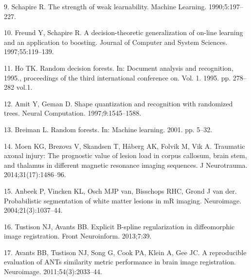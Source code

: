\documentclass[12pt,]{article}
\begin{document}
\hypertarget{ref-schapire1990}{}
9. Schapire R. The strength of weak learnability. Machine Learning.
1990;5:197--227.

\hypertarget{ref-freund1997}{}
10. Freund Y, Schapire R. A decision-theoretic generalization of on-line
learning and an application to boosting. Journal of Computer and System
Sciences. 1997;55:119--139.

\hypertarget{ref-ho1995}{}
11. Ho TK. Random decision forests. In: Document analysis and
recognition, 1995., proceedings of the third international conference
on. Vol. 1. 1995. pp. 278--282 vol.1.

\hypertarget{ref-amit1997}{}
12. Amit Y, Geman D. Shape quantization and recognition with randomized
trees. Neural Computation. 1997;9:1545--1588.

\hypertarget{ref-breiman2001}{}
13. Breiman L. Random forests. In: Machine learning. 2001. pp. 5--32.

\hypertarget{ref-Moen:2014aa}{}
14. Moen KG, Brezova V, Skandsen T, Håberg AK, Folvik M, Vik A.
Traumatic axonal injury: The prognostic value of lesion load in corpus
callosum, brain stem, and thalamus in different magnetic resonance
imaging sequences. J Neurotrauma. 2014;31(17):1486--96.

\hypertarget{ref-Anbeek:2004aa}{}
15. Anbeek P, Vincken KL, Osch MJP van, Bisschops RHC, Grond J van der.
Probabilistic segmentation of white matter lesions in mR imaging.
Neuroimage. 2004;21(3):1037--44.

\hypertarget{ref-Tustison:2013ac}{}
16. Tustison NJ, Avants BB. Explicit B-spline regularization in
diffeomorphic image registration. Front Neuroinform. 2013;7:39.

\hypertarget{ref-Avants:2011ab}{}
17. Avants BB, Tustison NJ, Song G, Cook PA, Klein A, Gee JC. A
reproducible evaluation of ANTs similarity metric performance in brain
image registration. Neuroimage. 2011;54(3):2033--44.
\end{document}
